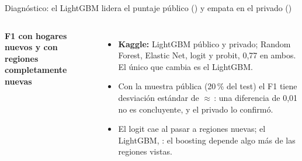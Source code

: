 \begin{frame}{Diagnóstico: el LightGBM lidera el puntaje público (\kgLGBM) y empata en el privado (\kgpLGBM)}
  \begin{columns}[T]
    \centering\small\textbf{F1 con hogares nuevos y con regiones completamente nuevas}\\[2mm]
    \footnotesize
    \resizebox{\linewidth}{!}{}\\[2mm]
    \small
    \begin{itemize}\setlength{\itemsep}{3pt}
      \item \textbf{Kaggle:} LightGBM \kgLGBM{} público y \kgpLGBM{} privado; Random Forest, Elastic Net, logit y probit, 0,77 en ambos. El único que cambia es el LightGBM.
      \item Con la muestra pública (20\,\% del test) el F1 tiene desviación estándar de $\approx$\,\nPublicSD{}: una diferencia de 0,01 no es concluyente, y el privado lo confirmó.
      \item El logit cae \nDropLogitRegions{} al pasar a regiones nuevas; el LightGBM, \nDropLGBMRegions{}: el boosting depende algo más de las regiones vistas.
    \end{itemize}
  \end{columns}
\end{frame}

